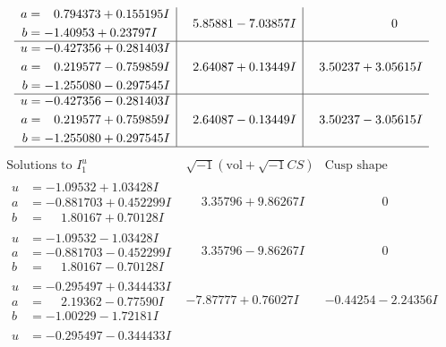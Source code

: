 \documentclass[1p]{elsarticle_modified}
\theoremstyle{definition}
\newcommand{\I}{\sqrt{-1}}
\begin{document}
$$\begin{array}{c|c|c}
\begin{aligned}
a &= \phantom{-}0.794373 + 0.155195 I \\
b &= -1.40953 + 0.23797 I\end{aligned}
 & \phantom{-}5.85881 - 7.03857 I & \phantom{-0.000000 } 0 \\ \hline\begin{aligned}
u &= -0.427356 + 0.281403 I \\
a &= \phantom{-}0.219577 - 0.759859 I \\
b &= -1.255080 - 0.297545 I\end{aligned}
 & \phantom{-}2.64087 + 0.13449 I & \phantom{-}3.50237 + 3.05615 I \\ \hline\begin{aligned}
u &= -0.427356 - 0.281403 I \\
a &= \phantom{-}0.219577 + 0.759859 I \\
b &= -1.255080 + 0.297545 I\end{aligned}
 & \phantom{-}2.64087 - 0.13449 I & \phantom{-}3.50237 - 3.05615 I\\
 \hline 
 \end{array}$$\newpage$$\begin{array}{c|c|c}  
\text{Solutions to }I^u_{1}& \I (\text{vol} + \sqrt{-1}CS) & \text{Cusp shape}\\
 \hline 
\begin{aligned}
u &= -1.09532 + 1.03428 I \\
a &= -0.881703 + 0.452299 I \\
b &= \phantom{-}1.80167 + 0.70128 I\end{aligned}
 & \phantom{-}3.35796 + 9.86267 I & \phantom{-0.000000 } 0 \\ \hline\begin{aligned}
u &= -1.09532 - 1.03428 I \\
a &= -0.881703 - 0.452299 I \\
b &= \phantom{-}1.80167 - 0.70128 I\end{aligned}
 & \phantom{-}3.35796 - 9.86267 I & \phantom{-0.000000 } 0 \\ \hline\begin{aligned}
u &= -0.295497 + 0.344433 I \\
a &= \phantom{-}2.19362 - 0.77590 I \\
b &= -1.00229 - 1.72181 I\end{aligned}
 & -7.87777 + 0.76027 I & -0.44254 - 2.24356 I \\ \hline\begin{aligned}
u &= -0.295497 - 0.344433 I \\

\end{aligned}
\end{array}$$
\end{document}
